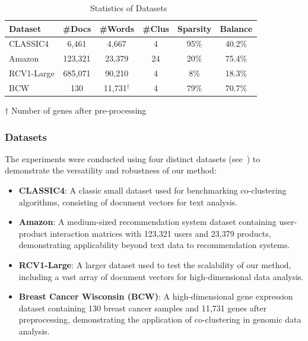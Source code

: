 \documentclass[journal]{IEEEtran}
\theoremstyle{definition}
\theoremstyle{remark} %
\renewcommand{\cite}[1]{~\autocite{#1}}
\begin{document}
\begin{table}[ht]
    \centering
    \caption{Statistics of Datasets\cite{role2019CoClustPythonPackage}}
    \label{tab:dataset-statistics}
    \begin{threeparttable}
        \begin{tabular}{l||c|c|c|c|c}
            \hline
            \textbf{Dataset} & \textbf{\#Docs} & \textbf{\#Words}   & \textbf{\#Clus} & \textbf{Sparsity} & \textbf{Balance} \\
            \hline
            CLASSIC4         & 6,461           & 4,667              & 4               & 95\%              & 40.2\%           \\
            Amazon           & 123,321         & 23,379             & 24              & 20\%              & 75.4\%           \\
            RCV1-Large       & 685,071         & 90,210             & 4               & 8\%               & 18.3\%           \\
            BCW              & 130             & 11,731$^{\dagger}$ & 4               & 79\%              & 70.7\%           \\
            \hline
        \end{tabular}
        \begin{tablenotes}
            \small
            \item[$\dagger$] Number of genes after pre-processing
        \end{tablenotes}
    \end{threeparttable}
\end{table}

\subsubsection{Datasets}
\label{subsec:datasets}
The experiments were conducted using four distinct datasets (see~) to demonstrate the versatility and robustness of our method:
\begin{itemize}
    \item \textbf{CLASSIC4}: A classic small dataset used for benchmarking co-clustering algorithms, consisting of document vectors for text analysis.
    \item \textbf{Amazon}: {\color{blue}A medium-sized recommendation system dataset containing user-product interaction matrices with 123,321 users and 23,379 products, demonstrating applicability beyond text data to recommendation systems.}
    \item \textbf{RCV1-Large}: A larger dataset used to test the scalability of our method, including a vast array of document vectors for high-dimensional data analysis.
    \item \textbf{Breast Cancer Wisconsin (BCW)}: {\color{blue}A high-dimensional gene expression dataset containing 130 breast cancer samples and 11,731 genes after preprocessing, demonstrating the application of co-clustering in genomic data analysis.}
\end{itemize}
\end{document}
